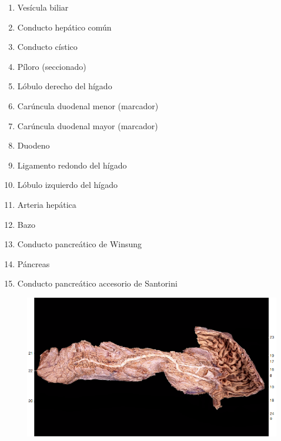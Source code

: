 \begin{enumerate}
    \item Vesícula biliar
    \item Conducto hepático común
    \item Conducto cístico
    \item Píloro (seccionado)
    \item Lóbulo derecho del hígado
    \item Carúncula duodenal menor (marcador)
    \item Carúncula duodenal mayor (marcador)
    \item Duodeno
    \item Ligamento redondo del hígado
    \item Lóbulo izquierdo del hígado
    \item Arteria hepática
    \item Bazo
    \item Conducto pancreático de Winsung
    \item Páncreas
    \item Conducto pancreático accesorio de Santorini    
\end{enumerate}
\begin{figure}[H]
	\begin{center}
 		\includegraphics[width = .7\textwidth]{v2/images/image7.png}
	\end{center} 
\end{figure}


